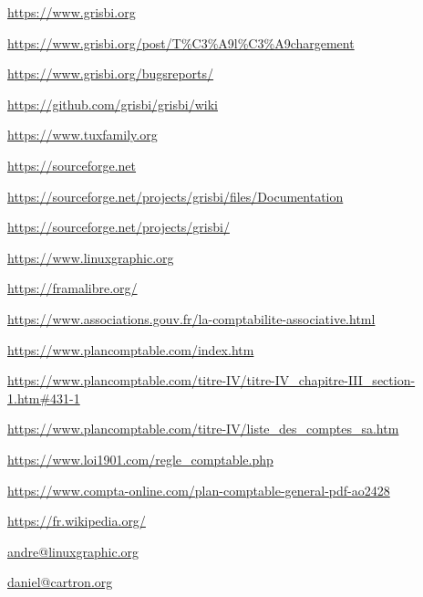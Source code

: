 

\urldef{\urlGrisbi}%
\url{https://www.grisbi.org}

\urldef{\urlGrisbiTelechargement}%
\url{https://www.grisbi.org/post/T%C3%A9l%C3%A9chargement}

\urldef{\urlBugTracker}%
\url{https://www.grisbi.org/bugsreports/}

\urldef{\urlGrisbiWiki}%
\url{https://github.com/grisbi/grisbi/wiki}

\urldef{\urlTuxFamily}%
\url{https://www.tuxfamily.org}

\urldef{\urlSourceForge}%
\url{https://sourceforge.net}

\urldef{\urlSourceForgeDocumentation}%
\url{https://sourceforge.net/projects/grisbi/files/Documentation}

\urldef{\urlGitGrisbi}%
\url{https://sourceforge.net/projects/grisbi/}

\urldef{\urlLinuxGraphic}%
\url{https://www.linuxgraphic.org}

\urldef{\urlFramasoftLogiciels}%
\url{https://framalibre.org/}

\urldef{\urlAssociationsGouv}%
\url{https://www.associations.gouv.fr/la-comptabilite-associative.html}

\urldef{\urlPlanComptable}%
\url{https://www.plancomptable.com/index.htm}

\urldef{\urlPlanDeComptes}%
\url{https://www.plancomptable.com/titre-IV/titre-IV_chapitre-III_section-1.htm#431-1}

\urldef{\urlListeComptes}%
\url{https://www.plancomptable.com/titre-IV/liste_des_comptes_sa.htm}

\urldef{\urlMaisonAssociations}%
\url{https://www.loi1901.com/regle_comptable.php}

\urldef{\urlComptaOnLine}%
\url{https://www.compta-online.com/plan-comptable-general-pdf-ao2428}

\urldef{\urlWikipedia}%
\url{https://fr.wikipedia.org/}

\urldef{\urlAndrePascualEmail}%
\url{andre@linuxgraphic.org}%

\urldef{\urlDanielCartronEmail}%
\url{daniel@cartron.org}    %


